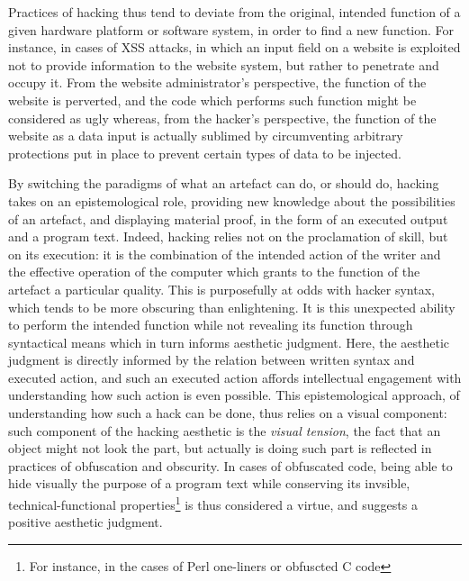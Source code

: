Practices of hacking thus tend to deviate from the original, intended function of a given hardware platform or software system, in order to find a new function. For instance, in cases of XSS attacks, in which an input field on a website is exploited not to provide information to the website system, but rather to penetrate and occupy it. From the website administrator's perspective, the function of the website is perverted, and the code which performs such function might be considered as ugly whereas, from the hacker's perspective, the function of the website as a data input is actually sublimed by circumventing arbitrary protections put in place to prevent certain types of data to be injected.

By switching the paradigms of what an artefact can do, or should do, hacking takes on an epistemological role, providing new knowledge about the possibilities of an artefact, and displaying material proof, in the form of an executed output and a program text. Indeed, hacking relies not on the proclamation of skill, but on its execution: it is the combination of the intended action of the writer and the effective operation of the computer which grants to the function of the artefact a particular quality. This is purposefully at odds with hacker syntax, which tends to be more obscuring than enlightening. It is this unexpected ability to perform the intended function while not revealing its function through syntactical means which in turn informs aesthetic judgment. Here, the aesthetic judgment is directly informed by the relation between written syntax and executed action, and such an executed action affords intellectual engagement with understanding how such action is even possible. This epistemological approach, of understanding how such a hack can be done, thus relies on a visual component: such component of the hacking aesthetic is the \emph{visual tension}, the fact that an object might not look the part, but actually is doing such part is reflected in practices of obfuscation and obscurity. In cases of obfuscated code, being able to hide visually the purpose of a program text while conserving its invsible, technical-functional properties\footnote{For instance, in the cases of Perl one-liners or obfuscted C code} is thus considered a virtue, and suggests a positive aesthetic judgment.

